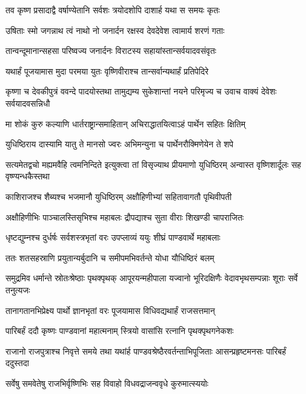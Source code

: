 
\twolineshloka
{तव कृष्ण प्रसादाद्वै वर्षाण्येतानि सर्वशः}
{त्रयोदशोपि दाशार्ह यथा स समयः कृतः}


\twolineshloka
{उषिताः स्मो जगन्नाथ त्वं नाथो नो जनार्दन}
{रक्षस्व देवदेवेश त्वामार्य शरणं गताः}



\twolineshloka
{तान्वन्दूमानान्सहसा परिष्वज्य जनार्दनः}
{विराटस्य सहायांस्तान्सर्वयादवसंवृतः}


\twolineshloka
{यथार्हं पूजयामास मुदा परमया युतः}
{वृष्णिवीराश्च तान्सर्वान्यथार्हं प्रतिपेदिरे}


\threelineshloka
{कृष्णा च देवकीपुत्रं ववन्दे पादयोस्तथा}
{तामुद्यम्य सुकेशान्तां नयने परिमृज्य च}
{उवाच वाक्यं देवेशः सर्वयादवसन्निधौ}


\twolineshloka
{मा शोकं कुरु कल्याणि धार्तराष्ट्रान्समाहितान्}
{अचिराद्धातयित्वाऽहं पार्थेन सहितः क्षितिम्}


\twolineshloka
{युधिष्ठिराय दास्यामि यातु ते मानसो ज्वरः}
{अभिमन्युना च पार्थेनरौक्मिणेयेन ते शपे}


\threelineshloka
{सत्यमेतद्वचो मह्यमवैहि त्वमनिन्दिते}
{इत्युक्त्वा तां विसृज्याथ प्रीयमाणो युधिष्ठिरम्}
{अन्वास्त वृष्णिशार्दूलः सह वृष्ण्यन्धकैस्तथा}


\twolineshloka
{काशिराजश्च शैब्यश्च भजमानौ युधिष्ठिरम्}
{अक्षौहिणीभ्यां सहितावागतौ पृथिवीपती}


\twolineshloka
{अक्षौहिणीभिः पाञ्चालस्तिसृभिश्च महाबलः}
{द्रौपद्याश्च सुता वीराः शिखण्डी चापराजितः}


\twolineshloka
{धृष्टद्युम्नश्च दुर्धर्षः सर्वशस्त्रभृतां वरः}
{उपप्लाव्यं ययुः शीघ्रं पाण्डवार्थे महाबलाः}


\twolineshloka
{ततः शतसहस्राणि प्रयुतान्यर्बुदानि च}
{समीपमभिवर्तन्ते योधा यौधिष्ठिरं बलम्}


\threelineshloka
{समुद्रमिव धर्मान्ते स्रोतःश्रेष्ठाः पृथक्पृथक्}
{आपूरयन्महीपाला यज्वानो भूरिदक्षिणैः}
{वेदावभृथसम्पन्नाः शूराः सर्वे तनुत्यजः}


\twolineshloka
{तानागतानभिप्रेक्ष्य पार्थो ज्ञानभृतां वरः}
{पूजयामास विधिवद्यथार्हं राजसत्तमान्}


\twolineshloka
{पारिबर्हं ददौ कृष्णः पाण्डवानां महात्मनाम्}
{स्त्रियो वासांसि रत्नानि पृथक्पृथगनेकशः}


\threelineshloka
{राजानो राजपुत्राश्च निवृत्ते समये तथा}
{यथांर्ह पाण्डवश्रेष्ठैरवर्तन्ताभिपूजिताः}
{आसन्प्रहृष्टमनसः पारिबर्हं ददुस्तदा}


\twolineshloka
{सर्वेषु समवेतेषु राजभिर्वृष्णिभिः सह}
{विवाहो विधवद्राजन्ववृधे कुरुमात्स्ययोः}


